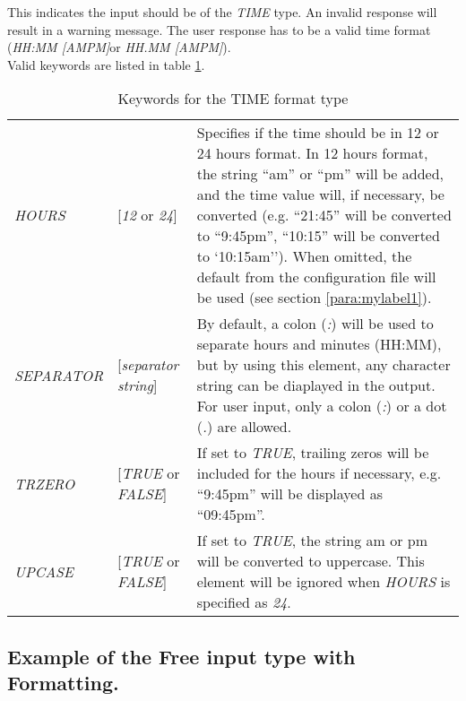 \documentclass[a4paper]{book}
\begin{document}
This indicates the input should be of the \textsl{TIME} type. An invalid response 
will result in a warning message. The user response has to be a valid time 
format (\textsl{HH:MM [AM\textbar PM]}or \textsl{HH.MM [AM\textbar PM]}).\\ 
Valid keywords are listed in table \ref{tab:time}.

\begin{table}[h!tb]
\begin{minipage}[h!tb]{\textwidth}
\begin{tabular}{llp{6cm}} \hline
\textsl{HOURS} & [\textsl{12} or \textsl{24}] &  Specifies if the time should be in 12 or 24 hours format. In 
12 hours format, the string ``am'' or ``pm'' will be added, and the time 
value will, if necessary, be converted (e.g. ``21:45'' will be converted 
to ``9:45pm'', ``10:15'' will be converted to `10:15am''). \linebreak
When omitted, the default from the configuration file will be 
used (see section \ref{para:mylabel1}).\\
\textsl{SEPARATOR} & [\textit{separator string}] & By default, a colon (\textsl{:}) will be used to separate hours and minutes 
(HH:MM), but by using this element, any character string can 
be diaplayed in the output. For user input, only a colon (\textsl{:}) or a dot (\textsl{.}) are allowed. \\
\textsl{TRZERO} & [\textsl{TRUE} or \textsl{FALSE}] & If set to \textsl{TRUE}, trailing zeros will be included for the hours 
if necessary, e.g. ``9:45pm'' will be displayed as ``09:45pm''.\\
\textsl{UPCASE} & [\textsl{TRUE} or \textsl{FALSE}] &  If set to \textsl{TRUE}, the string am or pm will be converted to uppercase. 
This element will be ignored when \textsl{HOURS} is specified as \textsl{24}. \\ \hline
\end{tabular}
\caption{Keywords for the TIME format type}\label{tab:time}
\end{minipage}
\end{table}

\subsection{Example of the Free input type with Formatting.}\label{subsubsec:mylabel38}
\end{document}

